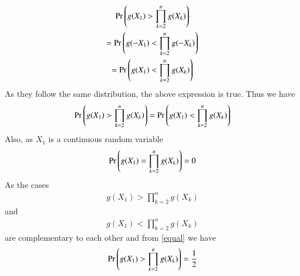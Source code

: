 \documentclass[journal,12pt,twocolumn]{IEEEtran}
\begin{document}
\begin{multline}
    \Pr\left(g(X_1)>\prod_{k=2}^ng(X_k)\right)\\=
    \Pr\left(g(-X_1)<\prod_{k=2}^ng(-X_k)\right)\\=
    \Pr\left(g(X_1)<\prod_{k=2}^ng(X_k)\right)
\end{multline}
As they follow the same distribution, the above expression is true. Thus we have
\begin{align}\label{equal}
    \Pr\left(g(X_1)>\prod_{k=2}^ng(X_k)\right)=
    \Pr\left(g(X_1)<\prod_{k=2}^ng(X_k)\right)
\end{align}
Also, as $X_1$ is a continuous random variable
\begin{align}
    \Pr\left(g(X_1)=\prod_{k=2}^ng(X_k)\right)=0
\end{align}
As the cases
\begin{align}
    g(X_1)>\prod_{k=2}^ng(X_k)
\end{align}
and
\begin{align}
    {g(X_1)<\prod_{k=2}^ng(X_k)}
\end{align}
are complementary to each other and from 
 \eqref{equal} we have
\begin{align}\label{prod}
 \Pr\left(g(X_1)>\prod_{k=2}^ng(X_k)\right)=\frac{1}{2}    
\end{align}
\end{document}
